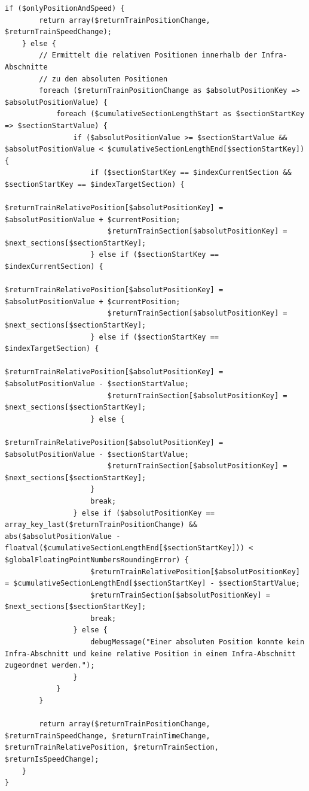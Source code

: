 \begin{lstlisting}[caption={\textit{createTrainChanges$($$)$} (\textit{functions\_fahrtverlauf.php})},captionpos=b,label={lst:createTrainChanges}]
	if ($onlyPositionAndSpeed) {
		return array($returnTrainPositionChange, $returnTrainSpeedChange);
	} else {
		// Ermittelt die relativen Positionen innerhalb der Infra-Abschnitte
		// zu den absoluten Positionen
		foreach ($returnTrainPositionChange as $absolutPositionKey => $absolutPositionValue) {
			foreach ($cumulativeSectionLengthStart as $sectionStartKey => $sectionStartValue) {
				if ($absolutPositionValue >= $sectionStartValue && $absolutPositionValue < $cumulativeSectionLengthEnd[$sectionStartKey]) {
					if ($sectionStartKey == $indexCurrentSection && $sectionStartKey == $indexTargetSection) {
						$returnTrainRelativePosition[$absolutPositionKey] = $absolutPositionValue + $currentPosition;
						$returnTrainSection[$absolutPositionKey] = $next_sections[$sectionStartKey];
					} else if ($sectionStartKey == $indexCurrentSection) {
						$returnTrainRelativePosition[$absolutPositionKey] = $absolutPositionValue + $currentPosition;
						$returnTrainSection[$absolutPositionKey] = $next_sections[$sectionStartKey];
					} else if ($sectionStartKey == $indexTargetSection) {
						$returnTrainRelativePosition[$absolutPositionKey] = $absolutPositionValue - $sectionStartValue;
						$returnTrainSection[$absolutPositionKey] = $next_sections[$sectionStartKey];
					} else {
						$returnTrainRelativePosition[$absolutPositionKey] = $absolutPositionValue - $sectionStartValue;
						$returnTrainSection[$absolutPositionKey] = $next_sections[$sectionStartKey];
					}
					break;
				} else if ($absolutPositionKey == array_key_last($returnTrainPositionChange) && abs($absolutPositionValue - floatval($cumulativeSectionLengthEnd[$sectionStartKey])) < $globalFloatingPointNumbersRoundingError) {
					$returnTrainRelativePosition[$absolutPositionKey] = $cumulativeSectionLengthEnd[$sectionStartKey] - $sectionStartValue;
					$returnTrainSection[$absolutPositionKey] = $next_sections[$sectionStartKey];
					break;
				} else {
					debugMessage("Einer absoluten Position konnte kein Infra-Abschnitt und keine relative Position in einem Infra-Abschnitt zugeordnet werden.");
				}
			}
		}

		return array($returnTrainPositionChange, $returnTrainSpeedChange, $returnTrainTimeChange, $returnTrainRelativePosition, $returnTrainSection, $returnIsSpeedChange);
	}
}
\end{lstlisting}






